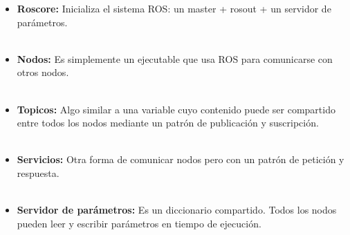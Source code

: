 \documentclass[a4paper,usenames,dvipsnames,svgnames,table]{book}
\begin{document}
\begin{itemize}
\item \textbf{Roscore:} Inicializa el sistema ROS: un master + rosout + un servidor de parámetros.\\
\\	
\item \textbf{Nodos:} Es simplemente un ejecutable que usa ROS para comunicarse con otros nodos.\\
\\
\item \textbf{Topicos:} Algo similar a una variable cuyo contenido puede ser compartido entre todos los nodos mediante un patrón de publicación y suscripción.\\
\\
\item \textbf{Servicios:} Otra forma de comunicar nodos pero con un patrón de petición y respuesta.\\
\\
\item \textbf{Servidor de parámetros:} Es un diccionario compartido. Todos los nodos pueden leer y escribir parámetros en tiempo de ejecución.\\
\end{itemize}
\end{document}
